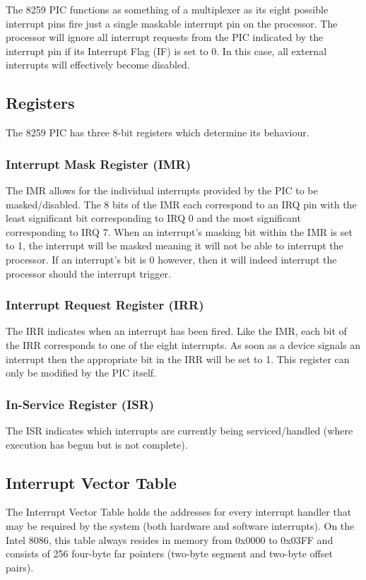     The 8259 PIC functions as something of a multiplexer as its eight possible interrupt pins fire just a single maskable interrupt pin on the processor. The processor will ignore all interrupt requests from the PIC indicated by the interrupt pin if its Interrupt Flag (IF) is set to 0. In this case, all external interrupts will effectively become disabled.

    \subsection{Registers}
        The 8259 PIC has three 8-bit registers which determine its behaviour.

        \subsubsection{Interrupt Mask Register (IMR)}
            The IMR allows for the individual interrupts provided by the PIC to be masked/disabled. The 8 bits of the IMR each correspond to an IRQ pin with the least significant bit corresponding to IRQ 0 and the most significant corresponding to IRQ 7. When an interrupt's masking bit within the IMR is set to 1, the interrupt will be masked meaning it will not be able to interrupt the processor. If an interrupt's bit is 0 however, then it will indeed interrupt the processor should the interrupt trigger.

        \subsubsection{Interrupt Request Register (IRR)}
            The IRR indicates when an interrupt has been fired. Like the IMR, each bit of the IRR corresponds to one of the eight interrupts. As soon as a device signals an interrupt then the appropriate bit in the IRR will be set to 1. This register can only be modified by the PIC itself.

        \subsubsection{In-Service Register (ISR)}
            The ISR indicates which interrupts are currently being serviced/handled (where execution has begun but is not complete).

    \subsection{Interrupt Vector Table}
        The Interrupt Vector Table holds the addresses for every interrupt handler that may be required by the system (both hardware and software interrupts). On the Intel 8086, this table always resides in memory from 0x0000 to 0x03FF and consists of 256 four-byte far pointers (two-byte segment and two-byte offset pairs).

